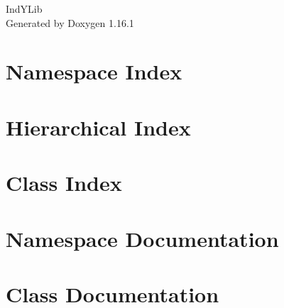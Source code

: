\documentclass[twoside]{book}
\newcommand{\+}{\discretionary{\mbox{\scriptsize$\hookleftarrow$}}{}{}}
\newcommand{\clearemptydoublepage}{%
    \newpage{\pagestyle{empty}\cleardoublepage}%
  }
\begin{document}
  \raggedbottom
    \hypersetup{pageanchor=false,
                bookmarksnumbered=true,
                pdfencoding=unicode
               }
  \begin{titlepage}
  \vspace*{7cm}
  \begin{center}%
  {\Large Ind\+YLib}\\
  \vspace*{1cm}
  {\large Generated by Doxygen 1.16.1}\\
  \end{center}
  \end{titlepage}
  \clearemptydoublepage
  \tableofcontents
  \clearemptydoublepage
  \hypersetup{pageanchor=true}

\chapter{Namespace Index}

\chapter{Hierarchical Index}

\chapter{Class Index}

\chapter{Namespace Documentation}








\chapter{Class Documentation}










  \backmatter
  \newpage
  \clearemptydoublepage
  \printindex
\end{document}
